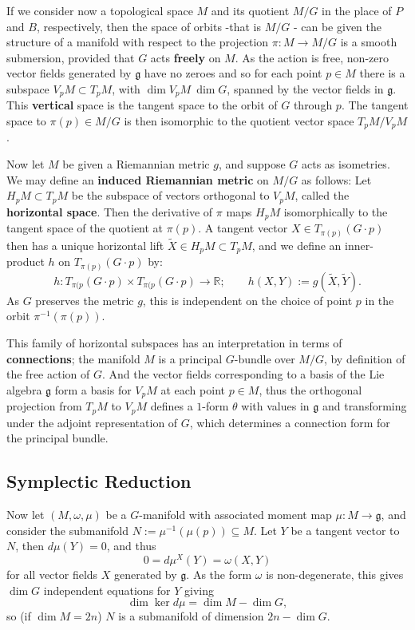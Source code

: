 \documentclass{article}
\newcommand{\ra}{\rightarrow}
\newcommand{\lra}{\longrightarrow}
\newcommand{\w}{\omega}
\newcommand{\RR}{\mathbb{R}}
\newcommand{\mfg}{\mathfrak{g}}
\begin{document}
	If we consider now a topological space $M$ and its quotient $M/G$ in the place of $P$ and $B$, respectively, then the space of orbits -that is $M/G$ - can be given the structure of a manifold with respect to the projection $\pi : M \ra M/G$ is a smooth submersion, provided that $G$ acts \textbf{freely} on $M$. As the action is free, non-zero vector fields generated by $\mfg$ have no zeroes and so for each point $p \in M$ there is a subspace $V_{p}M \subset T_{p}M$, with $\dim V_{p}M \ \dim G$, spanned by the vector fields in $\mfg$. This \textbf{vertical} space is the tangent space to the orbit of $G$ through $p$. The tangent space to $\pi(p) \in M/G$ is then isomorphic to the quotient vector space $T_{p}M/V_{p}M$.
	
	Now let $M$ be given a Riemannian metric $g$, and suppose $G$ acts as isometries. We may define an \textbf{induced Riemannian metric} on $M/G$ as follows: Let $H_{p}M \subset T_{p}M$ be the subspace of vectors orthogonal to $V_{p}M$, called the \textbf{horizontal space}. Then the derivative of $\pi$ maps $H_{p}M$ isomorphically to the tangent space of the quotient at $\pi(p)$. A tangent vector $X \in T_{\pi(p)}(G \cdot p)$ then has a unique horizontal lift $\tilde{X} \in H_{p}M \subset T_{p}M$, and we define an inner-product $h$ on $T_{\pi(p)}( G \cdot p)$ by:
	\[
		h : T_{\pi(p}(G \cdot p) \times T_{\pi(p}(G \cdot p) \lra \RR; \qquad h(X,Y) := g(\tilde{X}, \tilde{Y}).
	\]
	As $G$ preserves the metric $g$, this is independent on the choice of point $p$ in the orbit $\pi^{-1}\left(\pi(p)\right)$.
	
	This family of horizontal subspaces has an interpretation in terms of \textbf{connections}; the manifold $M$ is a principal $G$-bundle over $M/G$, by definition of the free action of $G$. And the vector fields corresponding to a basis of the Lie algebra $\mfg$ form a basis for $V_{p}M$ at each point $p \in M$, thus the orthogonal projection from $T_{p}M$ to $V_{p}M$ defines a $1$-form $\theta$ with values in $\mfg$ and transforming under the adjoint representation of $G$, which determines a connection form for the principal bundle.
	
	\subsection{Symplectic Reduction}
	
	Now let $(M, \w, \mu)$ be a $G$-manifold with associated moment map $\mu : M \ra \mfg$, and consider the submanifold $N := \mu^{-1}(\mu(p)) \subseteq M$. Let $Y$ be a tangent vector to $N$, then $d\mu(Y) = 0$, and thus
	\[
		0 = d\mu^{X}(Y) = \w(X,Y)
	\]
	for all vector fields $X$ generated by $\mfg$. As the form $\w$ is non-degenerate, this gives $\dim G$ independent equations for $Y$ giving
	\[
		\dim \ker d\mu = \dim M - \dim G,
	\]
	so (if $\dim M = 2n$) $N$ is a submanifold of dimension $2n - \dim G$.
	
\end{document}
